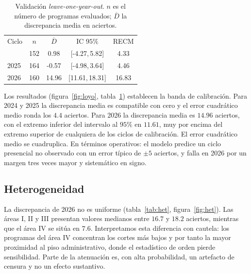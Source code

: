\documentclass[aps,prd,reprint,amsmath,amssymb,nofootinbib,superscriptaddress]{revtex4-2}
\begin{document}
\begin{table}[t]
\caption{Validaci\'on \emph{leave-one-year-out}. $n$ es el n\'umero de
programas evaluados; $\overline{D}$ la discrepancia media en aciertos.}
\label{tab:loyo}
\begin{ruledtabular}
\begin{tabular}{lcccc}
Ciclo & $n$ & $\overline{D}$ & IC $95\%$ & RECM \\ \colrule
2024 & 152 & 0.98 & [-4.27,\,5.82] & 4.33 \\
2025 & 164 & -0.57 & [-4.98,\,3.64] & 4.46 \\
2026 & 160 & 14.96 & [11.61,\,18.31] & 16.83 \\
\end{tabular}
\end{ruledtabular}
\end{table}

Los resultados (figura~\ref{fig:loyo}, tabla~\ref{tab:loyo}) establecen la
banda de calibraci\'on. Para 2024 y 2025 la discrepancia media es
compatible con cero y el error cuadr\'atico medio ronda los $4.4$
aciertos. Para 2026 la discrepancia media es $14.96$ aciertos, con el
extremo inferior del intervalo al $95\%$ en $11.61$, muy por encima del
extremo superior de cualquiera de los ciclos de calibraci\'on. El error
cuadr\'atico medio se cuadruplica. En t\'erminos operativos: el modelo
predice un ciclo presencial no observado con un error t\'ipico de $\pm 5$
aciertos, y falla en 2026 por un margen tres veces mayor y sistem\'atico
en signo.

\subsection{Heterogeneidad}

La discrepancia de 2026 no es uniforme (tabla~\ref{tab:het},
figura~\ref{fig:het}). Las \'areas I, II y III presentan valores medianos
entre $16.7$ y $18.2$ aciertos, mientras que el \'area IV se sit\'ua en
$7.6$. Interpretamos esta diferencia con cautela: los programas del
\'area IV concentran los cortes m\'as bajos y por tanto la mayor
proximidad al piso administrativo, donde el estad\'istico de orden pierde
sensibilidad. Parte de la atenuaci\'on es, con alta probabilidad, un
artefacto de censura y no un efecto sustantivo.
\end{document}
